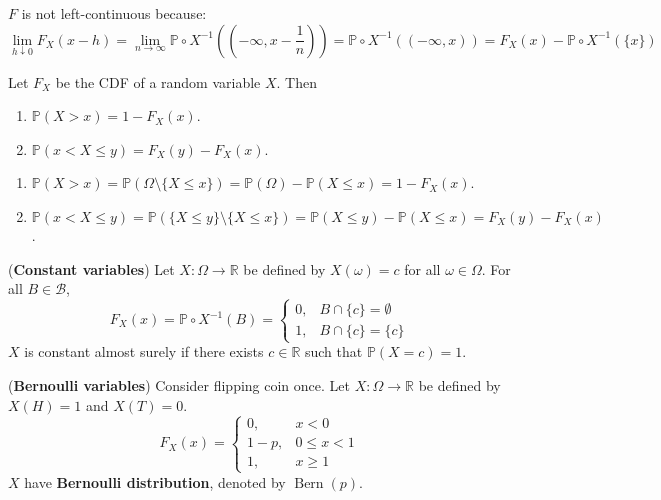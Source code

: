 \documentclass{huhtakm-template-book}
\newcommand{\prob}{\mathbb{P}}
\DeclareMathOperator{\Bern}{Bern}
\begin{document}
    \begin{rem}
        $F$ is not left-continuous because:
        \begin{equation*}
            \lim_{h\downarrow 0}F_{X}(x-h)=\lim_{n\to\infty}\prob\circ X^{-1}\left(\left(-\infty,x-\frac{1}{n}\right)\right)=\prob\circ X^{-1}((-\infty,x))=F_{X}(x)-\prob\circ X^{-1}(\{x\})
        \end{equation*}
    \end{rem}
    \begin{lem}
        Let $F_{X}$ be the CDF of a random variable $X$. Then
        \begin{enumerate}
            \item $\prob(X>x)=1-F_{X}(x)$.
            \item $\prob(x<X\leq y)=F_{X}(y)-F_{X}(x)$.
        \end{enumerate}
    \end{lem}
    \begin{proofing}
        \begin{enumerate}
            \item $\prob(X>x)=\prob(\Omega\setminus\{X\leq x\})=\prob(\Omega)-\prob(X\leq x)=1-F_{X}(x)$.
            \item $\prob(x<X\leq y)=\prob(\{X\leq y\}\setminus\{X\leq x\})=\prob(X\leq y)-\prob(X\leq x)=F_{X}(y)-F_{X}(x)$.
        \end{enumerate}
    \end{proofing}
    \begin{eg}(\textbf{Constant variables})
        Let $X:\Omega\to\mathbb{R}$ be defined by $X(\omega)=c$ for all $\omega\in\Omega$. For all $B\in\mathcal{B}$,
        \begin{equation*}
            F_{X}(x)=\prob\circ X^{-1}(B)=\begin{cases}
                0, &B\cap\{c\}=\emptyset\\
                1, &B\cap\{c\}=\{c\}
            \end{cases}
        \end{equation*}
        $X$ is constant almost surely if there exists $c\in\mathbb{R}$ such that $\prob(X=c)=1$.
    \end{eg}
    \begin{eg}(\textbf{Bernoulli variables})
        Consider flipping coin once. Let $X:\Omega\to\mathbb{R}$ be defined by $X(H)=1$ and $X(T)=0$.
        \begin{equation*}
            F_{X}(x)=\begin{cases}
                0, &x<0\\
                1-p, &0\leq x<1\\
                1, &x\geq 1
            \end{cases}
        \end{equation*}
        $X$ have \textbf{Bernoulli distribution}, denoted by $\Bern(p)$.
    \end{eg}
\end{document}
